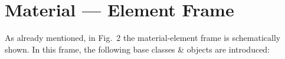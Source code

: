 \documentclass[a4paper]{article}
\newcommand{\class}[1]{{\bf #1}}
\newcommand{\service}[1]{{\em #1}}
\begin{document}




\section{Material --- Element Frame}
\label{materialEleemntFrame}
As already mentioned, in Fig.~2 the material-element
frame is schematically shown.
In this frame, the following base classes \&
objects are introduced:
\end{document}
